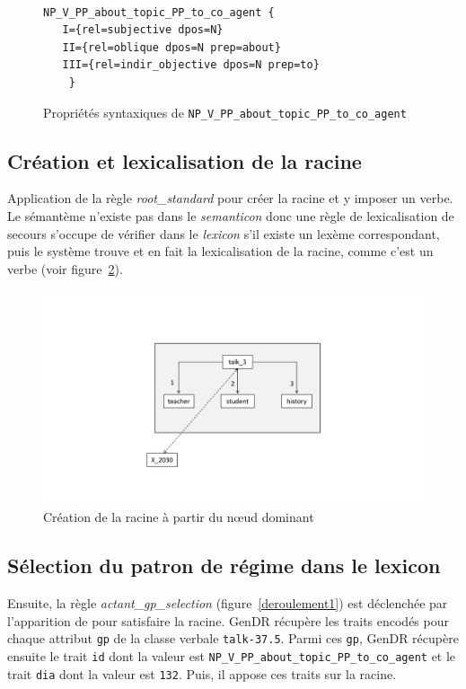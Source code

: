 \begin{figure}[htb]
  \caption{Propriétés syntaxiques de \texttt{NP\_V\_PP\_about\_topic\_PP\_to\_co\_agent}}
	\label{gpexemple}
\begin{lstlisting}[language=mate]

NP_V_PP_about_topic_PP_to_co_agent {
   I={rel=subjective dpos=N}
   II={rel=oblique dpos=N prep=about}
   III={rel=indir_objective dpos=N prep=to}
	}
\end{lstlisting}
\end{figure}

\subsection{Création et lexicalisation de la racine}
Application de la règle \emph{root\_standard} pour créer la racine et y imposer un verbe. Le sémantème  n'existe pas dans le \emph{semanticon} donc une règle de lexicalisation de secours s'occupe de vérifier dans le \emph{lexicon} s'il existe un lexème correspondant, puis le système trouve  et en fait la lexicalisation de la racine, comme c'est un verbe (voir figure~\ref{deroulement0}).

\begin{figure}[htb]
	\centering
	\includegraphics[width=1\textwidth, trim = {0cm 3.4cm 0cm 4.7cm},clip]{ch6/figs/root_implem.pdf}
	\caption{Création de la racine à partir du n\oe{}ud dominant}
	\label{deroulement0}
\end{figure}

\subsection{Sélection du patron de régime dans le lexicon}
Ensuite, la règle \emph{actant\_gp\_selection} (figure~\ref{deroulement1}) est déclenchée par l'apparition de  pour satisfaire la racine. GenDR récupère les traits encodés pour chaque attribut \texttt{gp} de la classe verbale \texttt{talk-37.5}. Parmi ces \texttt{gp}, GenDR récupère ensuite le trait \texttt{id} dont la valeur est \texttt{NP\_V\_PP\_about\_topic\_PP\_to\_co\_agent} et le trait \texttt{dia} dont la valeur est \texttt{132}. Puis, il appose ces traits sur la racine.

